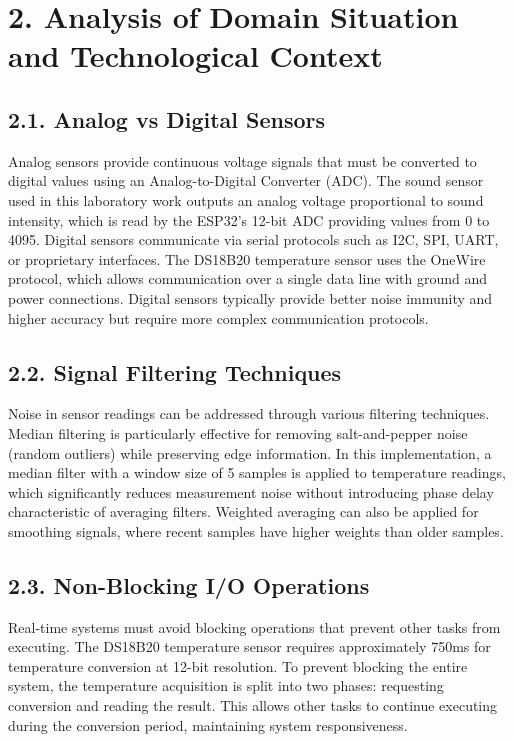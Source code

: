 \documentclass[12pt]{article}
\begin{document}
\section*{2. Analysis of Domain Situation and Technological Context}

\subsection*{2.1. Analog vs Digital Sensors}

Analog sensors provide continuous voltage signals that must be converted to digital values using an Analog-to-Digital Converter (ADC). The sound sensor used in this laboratory work outputs an analog voltage proportional to sound intensity, which is read by the ESP32's 12-bit ADC providing values from 0 to 4095. Digital sensors communicate via serial protocols such as I2C, SPI, UART, or proprietary interfaces. The DS18B20 temperature sensor uses the OneWire protocol, which allows communication over a single data line with ground and power connections. Digital sensors typically provide better noise immunity and higher accuracy but require more complex communication protocols.

\subsection*{2.2. Signal Filtering Techniques}

Noise in sensor readings can be addressed through various filtering techniques. Median filtering is particularly effective for removing salt-and-pepper noise (random outliers) while preserving edge information. In this implementation, a median filter with a window size of 5 samples is applied to temperature readings, which significantly reduces measurement noise without introducing phase delay characteristic of averaging filters. Weighted averaging can also be applied for smoothing signals, where recent samples have higher weights than older samples.

\subsection*{2.3. Non-Blocking I/O Operations}

Real-time systems must avoid blocking operations that prevent other tasks from executing. The DS18B20 temperature sensor requires approximately 750ms for temperature conversion at 12-bit resolution. To prevent blocking the entire system, the temperature acquisition is split into two phases: requesting conversion and reading the result. This allows other tasks to continue executing during the conversion period, maintaining system responsiveness.
\end{document}
